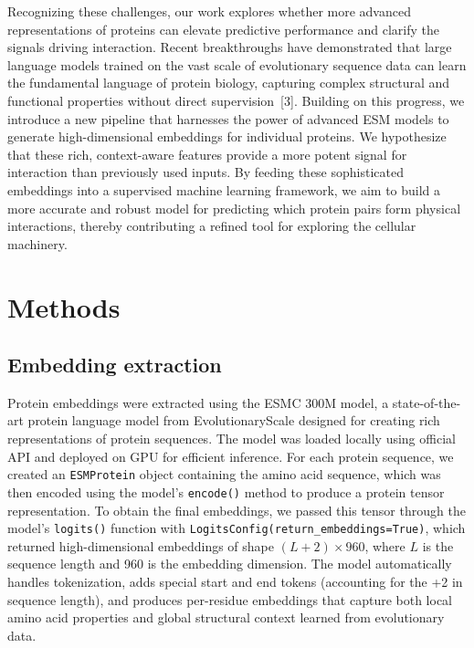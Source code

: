 \documentclass{article}
\begin{document}
Recognizing these challenges, our work explores whether more advanced representations of proteins can elevate predictive performance and clarify the signals driving interaction. Recent breakthroughs have demonstrated that large language models trained on the vast scale of evolutionary sequence data can learn the fundamental language of protein biology, capturing complex structural and functional properties without direct supervision~[3]. Building on this progress, we introduce a new pipeline that harnesses the power of advanced ESM models to generate high-dimensional embeddings for individual proteins. We hypothesize that these rich, context-aware features provide a more potent signal for interaction than previously used inputs. By feeding these sophisticated embeddings into a supervised machine learning framework, we aim to build a more accurate and robust model for predicting which protein pairs form physical interactions, thereby contributing a refined tool for exploring the cellular machinery.
	
	
	\section{Methods}

	\subsection{Embedding extraction}

Protein embeddings were extracted using the ESMC 300M model, a state-of-the-art protein language model from EvolutionaryScale designed for creating rich representations of protein sequences. The model was loaded locally using official API and deployed on GPU for efficient inference. For each protein sequence, we created an \texttt{ESMProtein} object containing the amino acid sequence, which was then encoded using the model's \texttt{encode()} method to produce a protein tensor representation. To obtain the final embeddings, we passed this tensor through the model's \texttt{logits()} function with \texttt{LogitsConfig(return\_embeddings=True)}, which returned high-dimensional embeddings of shape $(L+2) \times 960$, where $L$ is the sequence length and 960 is the embedding dimension. The model automatically handles tokenization, adds special start and end tokens (accounting for the +2 in sequence length), and produces per-residue embeddings that capture both local amino acid properties and global structural context learned from evolutionary data.
	
\end{document}

